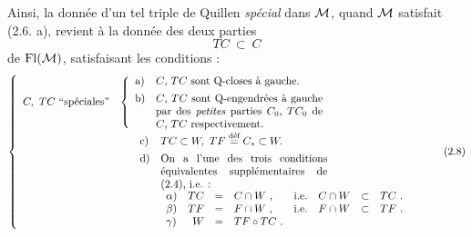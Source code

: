 Ainsi, la donnée d'un tel triple de Quillen \textit{spécial} dans $\mathcal{M}$, quand $\mathcal{M}$ satisfait (2.6. a), revient à la donnée des deux parties
\[
TC \ \subset\ C
\tag*{(2.7)}
\]
de $\mathrm{Fl}(\mathcal{M})$, satisfaisant les conditions :
\[
\left\{
\begin{array}{ll}
C,\ TC\ \text{“spéciales”} &
\left\{\begin{array}{ll}
\text{a)} & \text{$C$, $TC$ sont Q-closes à gauche.}\\[1ex]
\text{b)} & \parbox[t]{0.45\textwidth}{$C$, $TC$ sont Q-engendrées à gauche par des \textit{petites} parties $C_0$, $TC_0$ de $C$, $TC$ respectivement.}
\end{array}\right.\\[5ex]
 & \quad\ \begin{array}{ll}
\text{c)} & TC \subset W,\ TF \overset{\text{déf}}{=} C_* \subset W.\\[1ex]
\text{d)} & \parbox[t]{0.45\textwidth}{On a l'une des trois conditions équivalentes supplémentaires de (2.4), i.e. :}\\[5ex]
 & \begin{array}{lrcllrcl}
\alpha) & TC & = & C \cap W\ , & \text{i.e.} & C \cap W & \subset & TC\ .\\
\beta) & TF & = & F \cap W\ , & \text{i.e.} & F \cap W & \subset & TF\ .\\
\gamma) & W & = & TF \circ TC\ . & & & &
\end{array}
\end{array}
\end{array}\right.
\tag*{(2.8)}
\]

